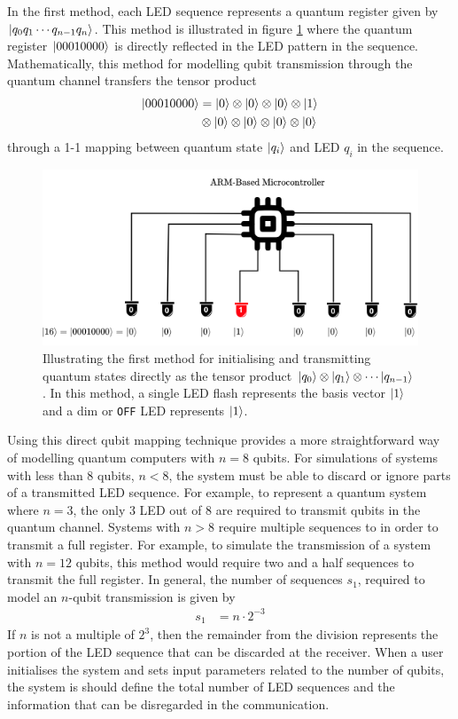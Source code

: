 In the first method, each LED sequence represents a quantum register given by $\ket{q_{0}q_1\cdots q_{n-1}q_n}$. This method is illustrated in figure \ref{fig:qubit-mapping-method-1} where the quantum register $\ket{00010000}$ is directly reflected in the LED pattern in the sequence. Mathematically, this method for modelling qubit transmission through the quantum channel transfers the tensor product 
\begin{align}
	\ket{00010000}	 &  = \ket{0} \otimes \ket{0} \otimes \ket{0} \otimes \ket{1}\nonumber\\& \otimes \ket{0} \otimes \ket{0} \otimes \ket{0} \otimes \ket{0}\nonumber
\end{align} 
through a 1-1 mapping between quantum state $\ket{q_i}$ and LED $q_i$ in the sequence.
\begin{figure}[!ht]
	\centering
	\includegraphics[width=\linewidth]{body/ch4/figs/qubit-mapping-method-1}
	\caption[Qubit Mapping Using LEDs for Direct Representation of the Computational Basis States $\ket{0}$ and $\ket{1}$.]{Illustrating the first method for initialising and transmitting quantum states directly as the tensor product $\ket{q_0} \otimes \ket{q_1} \otimes \cdots \ket{q_{n-1}}$. In this method, a single LED flash represents the basis vector $\ket{1}$ and a dim or \texttt{OFF} LED represents $\ket{1}$.}
	\label{fig:qubit-mapping-method-1}
\end{figure}
Using this direct qubit mapping technique provides a more straightforward way of modelling quantum computers with $n = 8$ qubits. For simulations of systems with less than 8 qubits, $n < 8$, the system must be able to discard or ignore parts of a transmitted LED sequence. For example, to represent a quantum system where $n = 3$, the only 3 LED out of 8 are required to transmit qubits in the quantum channel. Systems with $n > 8$ require multiple sequences to in order to transmit a full register. For example, to simulate the transmission of a system with $n = 12$ qubits, this method would require two and a half sequences to transmit the full register. In general, the number of sequences $s_1$, required to model an $n$-qubit transmission is given by
\begin{align}\label{eqn:number-of-sequences}
	s_1 & = n\cdot 2^{-3}
\end{align}
If $n$ is not a multiple of $2^3$, then the remainder from the division represents the portion of the LED sequence that can be discarded at the receiver. When a user initialises the system and sets input parameters related to the number of qubits, the system is should define the total number of LED sequences and the information that can be disregarded in the communication. 


